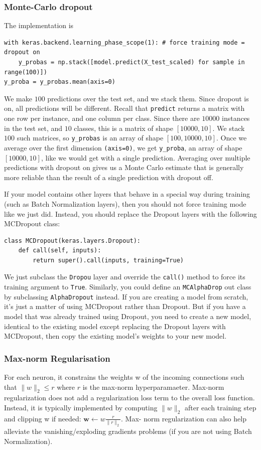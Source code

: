 \documentclass[12pt, letterpaper]{article}
\theoremstyle{definition}
\newcommand{\w}{\mathrm{\mathbf{w}}}
\let\cd\lstinline
\begin{document}
\subsubsection{Monte-Carlo dropout}
The implementation is
\begin{lstlisting}
with keras.backend.learning_phase_scope(1): # force training mode = dropout on 
	y_probas = np.stack([model.predict(X_test_scaled) for sample in range(100)]) 
y_proba = y_probas.mean(axis=0)
\end{lstlisting}
We make $100$ predictions over the test set, and we stack them. Since dropout is on, all predictions will be different. Recall that \cd+predict+ returns a matrix with one row per instance, and one column per class. Since there are $10000$ instances in the test set, and $10$ classes, this is a matrix of shape $[10000, 10]$. We stack $100$ such matrices, so \cd+y_probas+ is an array of shape $[100, 10000, 10]$. Once we average over the first dimension \cd+(axis=0)+, we get \cd+y_proba+, an array of shape $[10000, 10]$, like we would get with a single prediction. Averaging over multiple predictions with dropout on gives us a Monte Carlo estimate that is generally more reliable than the result of a single prediction with dropout off.

If your model contains other layers that behave in a special way during training (such as Batch Normalization layers), then you should not force training mode like we just did. Instead, you should replace the Dropout layers with the following MCDropout class:
\begin{lstlisting}
class MCDropout(keras.layers.Dropout):
	def call(self, inputs):
		return super().call(inputs, training=True)
\end{lstlisting}
We just subclass the \cd+Dropou+ layer and override the \cd+call()+ method to force its training argument to \cd+True+. Similarly, you could define an \cd+MCAlphaDrop+ out class by subclassing \cd+AlphaDropout+ instead. If you are creating a model from scratch, it's just a matter of using MCDropout rather than Dropout. But if you have a model that was already trained using Dropout, you need to create a new model, identical to the existing model except replacing the Dropout layers with MCDropout, then copy the existing model's weights to your new model.

\subsubsection{Max-norm Regularisation}
For each neuron, it constrains the weights w of the incoming connections such that $\|w\|_2 \le r$ where $r$ is the max-norm hyperparamaeter. Max-norm regularization does not add a regularization loss term to the overall loss function. Instead, it is typically implemented by computing $\|w\|_2$ after each training
step and clipping w if needed: $\w\leftarrow w\frac{r}{\|r\|_2}$. Max- norm regularization can also help alleviate the vanishing/exploding gradients problems (if you are not using Batch Normalization).
\end{document}
